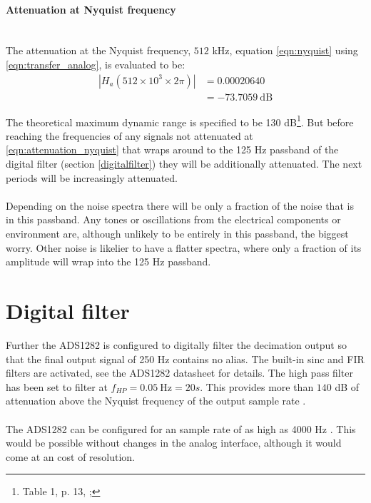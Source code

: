\documentclass[a4paper]{article}
\begin{document}
\begin{multicols}{2}
\paragraph{Attenuation at Nyquist frequency}\ \\
The attenuation at the Nyquist
frequency, $512$ kHz, equation \eqref{eqn:nyquist} using
\eqref{eqn:transfer_analog}, is evaluated to be:
\begin{equation}
  \begin{aligned}
  | H_a(512 \times 10^3 \times 2 \pi) | &= 0.00020640 \\
                                        &= -73.7059\ \text{dB}
  \end{aligned}
  \label{eqn:attenuation_nyquist}
\end{equation}

The theoretical maximum dynamic range is specified to be 130
dB\footnote{Table 1, p. 13, \cite{ads1282_ds}; }.
But before reaching the frequencies of any signals not attenuated at
\eqref{eqn:attenuation_nyquist} that wraps around to the 125 Hz passband of
the digital filter (section \ref{digitalfilter}) they will be additionally
attenuated. The next periods will be increasingly attenuated.
\paragraph{} Depending on the noise spectra there will
be only a fraction of the noise that is in this passband. Any tones or
oscillations from the electrical components or environment are, although
unlikely to be entirely in this passband, the biggest worry. Other noise
is likelier to have a flatter spectra, where only a fraction of its
amplitude will wrap into the 125 Hz passband.


\label{digitalfilter}
\section{Digital filter}
Further the ADS1282 is configured to digitally filter the decimation
output so that the final output signal of 250 Hz contains no alias. The
built-in sinc and FIR filters are activated, see the ADS1282 datasheet
\cite{ads1282_ds} for details. The high pass filter has been
set to filter at $f_{HP} = 0.05\ \text{Hz} = 20s$. This provides more
than $140$ dB of attenuation above the Nyquist frequency of the output
sample rate \cite{ads1282_ds}.
\paragraph{}The
ADS1282 can be configured for an sample rate of as high as 4000 Hz
\cite{ads1282_ds}. This would be possible without changes in the analog interface, although it would come at an cost of resolution.


\end{multicols}
\end{document}
